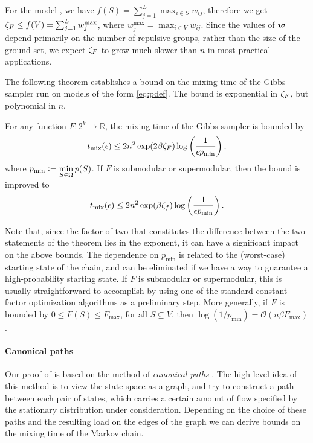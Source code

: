 For the \flid{} model , we have $f(S) = \sum_{j=1}^L \max_{i \in S} w_{ij}$, therefore we get $\zeta_F \leq f(V) = \sum_{j=1}^L w_j^{\mathrm{max}}$, where $w_j^{\mathrm{max}} = \max_{i \in V} w_{ij}$.
Since the values of $\bm{w}$ depend primarily on the number of repulsive groups, rather than the size of the ground set, we expect $\zeta_F$ to grow much slower than $n$ in most practical applications.

\vspace{1.5em}
\noindent The following theorem establishes a bound on the mixing time of the Gibbs sampler run on models of the form \eqref{eq:pdef}.
The bound is exponential in $\zeta_F$, but polynomial in $n$.
\begin{theorem} \label{thm:poly}
  For any function $F : 2^V \to \mathbb{R}$, the mixing time of the Gibbs sampler is bounded by
  \begin{align*}
    t_{\mathrm{mix}}(\epsilon) \leq 2n^2 \exp(2 \beta \zeta_F) \log\left(\frac{1}{\epsilon p_{\min}}\right),
  \end{align*}
  where $p_{\min} \vcentcolon= \displaystyle\min_{S \in \Omega}p(S)$.
  If $F$ is submodular or supermodular, then the bound is improved to
  \begin{align*}
    t_{\mathrm{mix}}(\epsilon) \leq 2n^2 \exp(\beta \zeta_f) \log\left(\frac{1}{\epsilon p_{\min}}\right).
  \end{align*}
\end{theorem}
Note that, since the factor of two that constitutes the difference between the two statements of the theorem lies in the exponent, it can have a significant impact on the above bounds.
The dependence on $p_{\min}$ is related to the (worst-case) starting state of the chain, and can be eliminated if we have a way to guarantee a high-probability starting state.
If $F$ is submodular or supermodular, this is usually straightforward to accomplish by using one of the standard constant-factor optimization algorithms \citep{nemhauser78,fujishige05} as a preliminary step.
More generally, if $F$ is bounded by $0 \leq F(S) \leq F_{\max}$, for all $S \subseteq V$, then $\log (1/p_{\min}) = \mathcal{O}(n \beta F_{\max})$.

\paragraph{Canonical paths}
Our proof of  is based on the method of \emph{canonical paths} \citep{jerrum03,sinclair92,jerrum89,diaconis91}.
The high-level idea of this method is to view the state space as a graph, and try to construct a path between each pair of states, which carries a certain amount of flow specified by the stationary distribution under consideration.
Depending on the choice of these paths and the resulting load on the edges of the graph we can derive bounds on the mixing time of the Markov chain.

